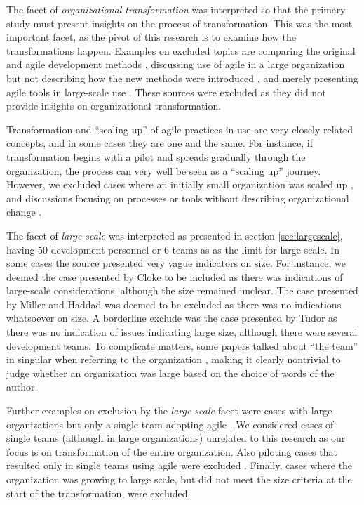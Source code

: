 \documentclass[preprint,authoryear,12pt]{elsarticle}
\begin{document}
The facet of \emph{organizational transformation} was interpreted so that the
primary study must present insights on the process of transformation. This
was the most important facet, as the pivot of this research is to examine
how the transformations happen. Examples on excluded topics are comparing the
original and agile development methods \cite{Petersen2010}, discussing use of
agile in a large organization but not describing how the new methods were
introduced \cite{Mishra2011}, and merely presenting agile tools in large-scale
use \cite{Kim2012}. These sources were excluded as they did not provide insights
on organizational transformation.

Transformation and ``scaling up'' of agile practices in use are very closely
related concepts, and in some cases they are one and the same. For instance, if
transformation begins with a pilot and spreads gradually through the
organization, the process can very well be seen as a ``scaling up'' journey.
However, we excluded cases where an initially small organization was scaled up
\cite{Maranzato2012}, and discussions focusing on processes or tools without
describing organizational change \cite{Lyon2008}.

The facet of \emph{large scale} was interpreted as presented in section
\ref{sec:largescale}, having 50 development personnel or 6 teams as as the limit
for large scale. In some cases the source presented very vague indicators on
size. For instance, we deemed the case presented by Cloke \cite{Cloke2007} to be
included as there was indications of large-scale considerations, although the
size remained unclear. The case presented by Miller and Haddad \cite{Miller2012}
was deemed to be excluded as there was no indications whatsoever on size. A
borderline exclude was the case presented by Tudor \cite{Tudor2006} as there was
no indication of issues indicating large size, although there were several
development teams.
To complicate matters, some papers talked about ``the team'' in singular when
referring to the organization \cite{Hodgkins2007}, making it clearly nontrivial
to judge whether an organization was large based on the choice of words of the
author.

Further examples on exclusion by the \emph{large scale} facet were cases with
large organizations but only a single team adopting agile \cite{Fulgham2011}.
We considered cases of single teams (although in large organizations) unrelated
to this research as our focus is on transformation of the entire organization.
Also piloting cases that resulted only in single teams using agile were excluded
\cite{Scott2008}. Finally, cases where the organization was growing to large
scale, but did not meet the size criteria at the start of the transformation,
were excluded.
\end{document}
